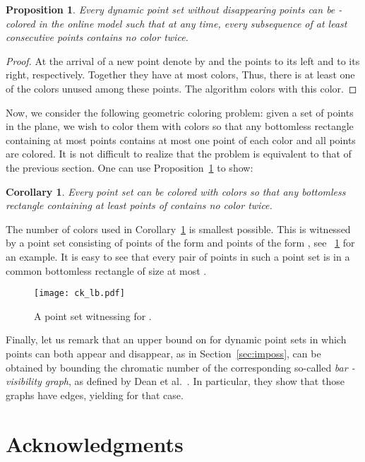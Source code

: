 \documentclass[11pt,a4paper]{amsart}
\theoremstyle{plain}
\newtheorem{cor}[theorem]{Corollary}
\newtheorem{prop}[theorem]{Proposition}
\theoremstyle{definition}
\begin{document}
\begin{prop}
\label{prop:c(k)}
Every dynamic point set without disappearing points can be -colored in the online model such that at any time, every subsequence of at least  consecutive points contains no color twice.
\end{prop}
\begin{proof}
At the arrival of a new point  denote by  and  the  points to its left and to its right, respectively. Together they have at most
 colors, Thus, there is at least one of the  colors unused among these points. The algorithm colors  with this color.
\end{proof}

Now, we consider the following geometric coloring problem: given a set of points in the plane, we wish to color them with  colors so that any bottomless rectangle containing at most  points contains at most one point of each color and all points are colored. It is not difficult to realize that the problem is equivalent to that of the previous section. One can use Proposition~\ref{prop:c(k)} to show:
\begin{cor}
\label{cor:c(k)}
Every point set  can be colored with  colors so that any bottomless rectangle containing at least  points of  contains no color twice.
\end{cor}

The number of colors used in Corollary~\ref{cor:c(k)} is smallest possible. This is witnessed by a point set  consisting of  points of the form 
and  points of the form , see \figurename~\ref{fig:ck_lb} for an example. It is easy to see that every pair of points in such a point set is in a common bottomless rectangle of size at most .

\begin{figure}[h!]
  \centering
  {\texttt{[image: ck\_lb.pdf]}}
  \caption{A point set witnessing  for .}
  \label{fig:ck_lb}
\end{figure}

Finally, let us remark that an upper bound on  for dynamic point sets in which points can both appear and disappear, as in Section~\ref{sec:imposs}, can be obtained by bounding 
the chromatic number of the corresponding so-called {\em bar -visibility graph}, as defined by Dean et al.~\cite{DEGLST07}. In particular, they show that those graphs have  edges, yielding 
for that case.

\section*{Acknowledgments}
\end{document}
